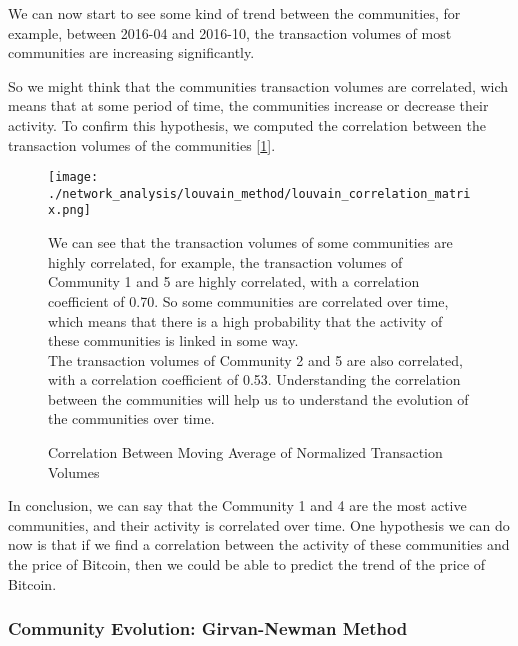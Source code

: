 \documentclass[a4paper, 12pt]{article}
\begin{document}
We can now start to see some kind of trend between the communities, for example, between 2016-04 and 2016-10, the transaction volumes
of most communities are increasing significantly.

So we might think that the communities transaction volumes are correlated, wich means that at some period of time, 
the communities increase or decrease their activity. 
To confirm this hypothesis, we computed the correlation between the transaction volumes of the communities [\ref{fig:louvain_correlation_matrix}].

\begin{figure}[h]
    \begin{minipage}{0.5\linewidth}
        \texttt{[image: ./network\_analysis/louvain\_method/louvain\_correlation\_matrix.png]}
        \caption{Correlation Between Moving Average of Normalized Transaction Volumes}
        \label{fig:louvain_correlation_matrix}
    \end{minipage}%
    \hspace{0.05\linewidth} %
    \begin{minipage}{0.45\linewidth}
        We can see that the transaction volumes of some communities are highly correlated, for example,
        the transaction volumes of Community 1 and 5 are highly correlated, with a correlation coefficient of 0.70.
        So some communities are correlated over time, which means that there is a high probability that the activity of these communities is linked in some way. \\
        
        The transaction volumes of Community 2 and 5 are also correlated, with a correlation coefficient of 0.53.
        Understanding the correlation between the communities will help us to understand the evolution of the communities over time. \\
        \vfill
    \end{minipage}
\end{figure}


In conclusion, we can say that the Community 1 and 4 are the most active communities, and their activity is correlated over time. 
One hypothesis we can do now is that if we find a correlation between the activity of these communities and the price of Bitcoin, 
then we could be able to predict the trend of the price of Bitcoin. 

\subsubsection{Community Evolution: Girvan-Newman Method}
\end{document}
